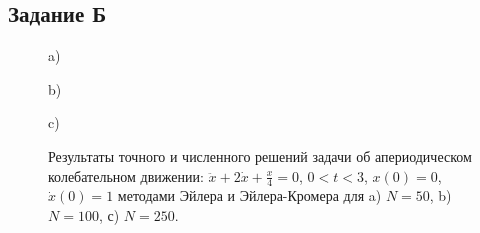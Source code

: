 \documentclass[
11pt,
master, %
subf, %
href, %
colorlinks=true, %
times, %
]{disser}
\begin{document}
\newpage
\subsection{Задание Б}
\begin{figure}[h]
\begin{minipage}[h]{1\linewidth}
 a) \\
\end{minipage}
\vfill
\begin{minipage}[h]{1\linewidth}
 b) \\
\end{minipage}
\vfill
\begin{minipage}[h]{1\linewidth}
 c) \\
\end{minipage}
\caption{Результаты точного и численного решений задачи об апериодическом колебательном движении: $\ddot{x} + 2 \dot{x} + \frac{x}{4} = 0$, $0<t<3$, $x(0) = 0$, $\dot{x}(0) = 1$  методами Эйлера и Эйлера-Кромера для a) $N = 50$, b) $N = 100$, с) $N = 250$.}
\label{ris:2}
\end{figure}
\end{document}
